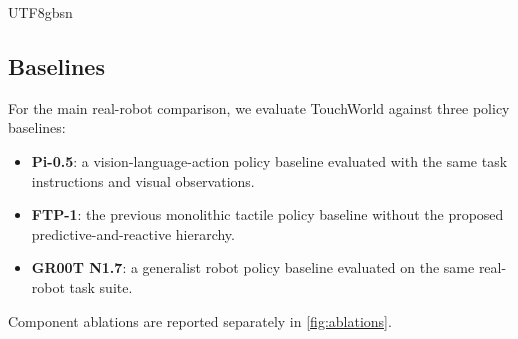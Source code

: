 \documentclass[]{mpai_report}
\begin{document}
\begin{CJK*}{UTF8}{gbsn}
\subsection{Baselines}

For the main real-robot comparison, we evaluate TouchWorld against three policy baselines:

\begin{itemize}
    \item \textbf{Pi-0.5}: a vision-language-action policy baseline evaluated with the same task instructions and visual observations.
    \item \textbf{FTP-1}: the previous monolithic tactile policy baseline without the proposed predictive-and-reactive hierarchy.
    \item \textbf{GR00T N1.7}: a generalist robot policy baseline evaluated on the same real-robot task suite.
\end{itemize}

Component ablations are reported separately in \cref{fig:ablations}.


\end{CJK*}
\end{document}
